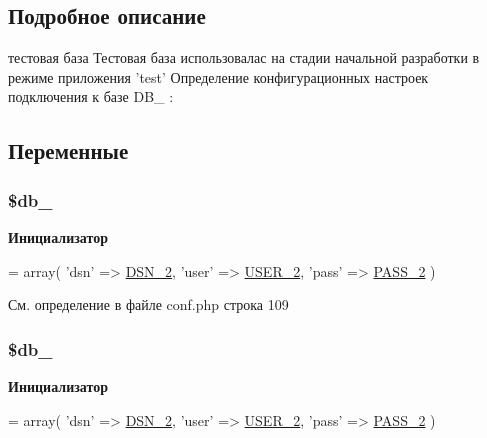 \subsection{Подробное описание}
тестовая база Тестовая база использовалас на стадии начальной разработки в режиме приложения 'test' Определение конфигурационных настроек подключения к базе D\-B\-\_ \-: 
 

\subsection{Переменные}
\hypertarget{group___d_b__2_ga35a69e2032e40a7d510004071c24c17c}{
\subsubsection[{\$db\-\_\-2}]{\setlength{\rightskip}{0pt plus 5cm}\$db\-\_}}\label{group___d_b__2_ga35a69e2032e40a7d510004071c24c17c}
{\bfseries Инициализатор}
\begin{DoxyCode}
= array(
    \textcolor{stringliteral}{'dsn'} => \hyperlink{group___d_b__2_ga72e6fba3d74199ad6e7e817a61e4a14d}{DSN\_2},
    \textcolor{stringliteral}{'user'} => \hyperlink{group___d_b__2_ga92b63a34ae60895214a8f31ebb5e9b58}{USER\_2},
    \textcolor{stringliteral}{'pass'} => \hyperlink{group___d_b__2_ga8b3fe80baea61cdf88958113cc16a363}{PASS\_2}
)
\end{DoxyCode}


См. определение в файле conf.\-php строка 109

\hypertarget{group___d_b__2_ga35a69e2032e40a7d510004071c24c17c}{
\subsubsection[{\$db\-\_\-2}]{\setlength{\rightskip}{0pt plus 5cm}\$db\-\_}}\label{group___d_b__2_ga35a69e2032e40a7d510004071c24c17c}
{\bfseries Инициализатор}
\begin{DoxyCode}
= array(
    \textcolor{stringliteral}{'dsn'} => \hyperlink{group___d_b__2_ga72e6fba3d74199ad6e7e817a61e4a14d}{DSN\_2},
    \textcolor{stringliteral}{'user'} => \hyperlink{group___d_b__2_ga92b63a34ae60895214a8f31ebb5e9b58}{USER\_2},
    \textcolor{stringliteral}{'pass'} => \hyperlink{group___d_b__2_ga8b3fe80baea61cdf88958113cc16a363}{PASS\_2}
)
\end{DoxyCode}


